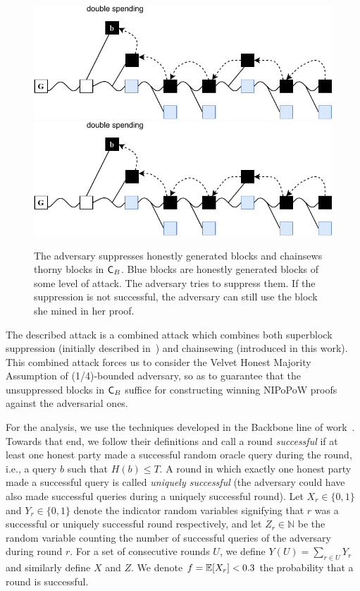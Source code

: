 \begin{figure}[h!]
    \begin{center}
        \iftwocolumn
            \includegraphics[width=0.95\columnwidth]{figures/attack_after_update-crop.pdf}
        \else
            \includegraphics[width=0.8\columnwidth]{figures/attack_after_update-crop.pdf}
        \fi
	\end{center}
	\caption{The adversary suppresses honestly generated blocks and chainsews thorny blocks in $\mathsf{C}_B$. Blue blocks are honestly generated blocks of some level of attack. The adversary tries to suppress them. If the suppression is not successful, the adversary can still use the block she mined in her proof.}
	\label{fig:attack_after_update}
\end{figure}

The described attack is a combined attack which combines both superblock suppression (initially described in~\cite{nipopows}) and chainsewing (introduced in this work). This combined attack forces us to consider the Velvet Honest Majority Assumption of (1/4)-bounded adversary, so as to guarantee that the unsuppressed blocks in $\mathsf{C}_B$ suffice for constructing winning NIPoPoW proofs against the adversarial ones.

For the analysis, we use the techniques
developed in the Backbone line of work~\cite{backbone}. Towards that end, we
follow their definitions and call a round \emph{successful} if at least one
honest party made a successful random oracle query during the round, i.e., a
query $b$ such that $H(b) \leq T$. A round in which exactly one honest party
made a successful query is called \emph{uniquely successful} (the adversary
could have also made successful queries during a uniquely successful round). Let
$X_r \in \{0, 1\}$ and $Y_r \in \{0, 1\}$ denote the indicator random variables
signifying that $r$ was a successful or uniquely successful round respectively,
and let $Z_r \in \mathbb{N}$ be the random variable counting the number of
successful queries of the adversary during round $r$. For a set of consecutive
rounds $U$, we define $Y(U) = \sum_{r \in U} Y_r$ and similarly define $X$ and
$Z$. We denote $f = \operatorname{\mathbb{E}}[X_r] < 0.3$ the probability that a round is successful.

